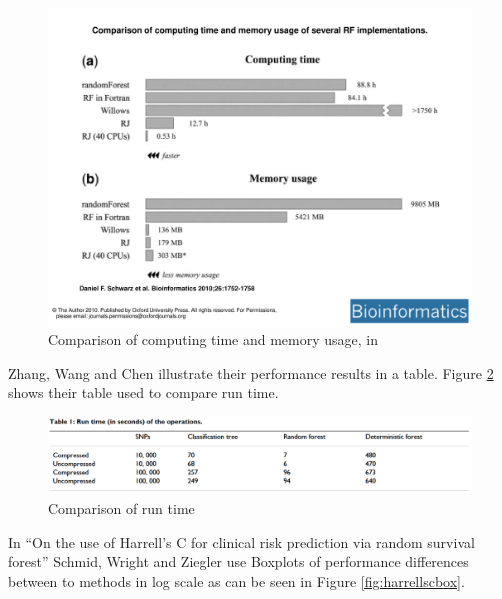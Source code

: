 \documentclass{sig-alternate-05-2015}
\begin{document}
\begin{figure}
\centering
\includegraphics[width=5in]{onsafaribar}
\caption{Comparison of computing time and memory usage, in \cite{schwarz2010safari}}
\label{fig:onsafaribar}
\end{figure}

Zhang, Wang and Chen illustrate their performance results in a table. Figure \ref{fig:willowstable} shows their table used to compare run time.

\begin{figure}
\centering
\includegraphics[width=5in]{willowstable}
\caption{Comparison of run time \cite{zhang2009willows} }
\label{fig:willowstable}
\end{figure}

In ``On the use of Harrell's C for clinical risk prediction via random survival forest'' Schmid, Wright and Ziegler use Boxplots of performance differences between to methods in log scale as can be seen in Figure \ref{fig:harrellscbox}.
\end{document}
